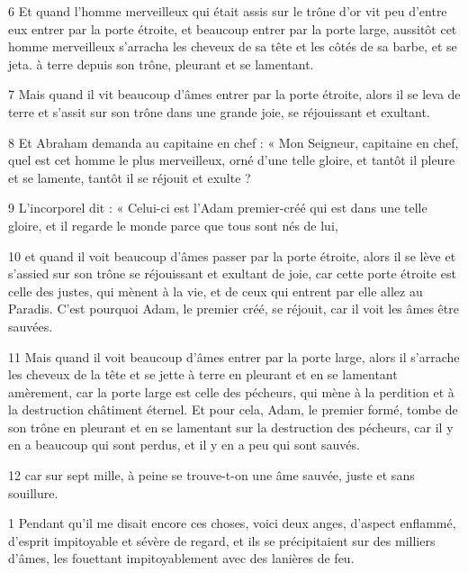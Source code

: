 \par 6 Et quand l'homme merveilleux qui était assis sur le trône d'or vit peu d'entre eux entrer par la porte étroite, et beaucoup entrer par la porte large, aussitôt cet homme merveilleux s'arracha les cheveux de sa tête et les côtés de sa barbe, et se jeta. à terre depuis son trône, pleurant et se lamentant.

\par 7 Mais quand il vit beaucoup d'âmes entrer par la porte étroite, alors il se leva de terre et s'assit sur son trône dans une grande joie, se réjouissant et exultant.

\par 8 Et Abraham demanda au capitaine en chef : « Mon Seigneur, capitaine en chef, quel est cet homme le plus merveilleux, orné d'une telle gloire, et tantôt il pleure et se lamente, tantôt il se réjouit et exulte ?

\par 9 L'incorporel dit : « Celui-ci est l'Adam premier-créé qui est dans une telle gloire, et il regarde le monde parce que tous sont nés de lui,

\par 10 et quand il voit beaucoup d'âmes passer par la porte étroite, alors il se lève et s'assied sur son trône se réjouissant et exultant de joie, car cette porte étroite est celle des justes, qui mènent à la vie, et de ceux qui entrent par elle allez au Paradis. C'est pourquoi Adam, le premier créé, se réjouit, car il voit les âmes être sauvées.

\par 11 Mais quand il voit beaucoup d'âmes entrer par la porte large, alors il s'arrache les cheveux de la tête et se jette à terre en pleurant et en se lamentant amèrement, car la porte large est celle des pécheurs, qui mène à la perdition et à la destruction châtiment éternel. Et pour cela, Adam, le premier formé, tombe de son trône en pleurant et en se lamentant sur la destruction des pécheurs, car il y en a beaucoup qui sont perdus, et il y en a peu qui sont sauvés.

\par 12 car sur sept mille, à peine se trouve-t-on une âme sauvée, juste et sans souillure.


\par 1 Pendant qu'il me disait encore ces choses, voici deux anges, d'aspect enflammé, d'esprit impitoyable et sévère de regard, et ils se précipitaient sur des milliers d'âmes, les fouettant impitoyablement avec des lanières de feu.


